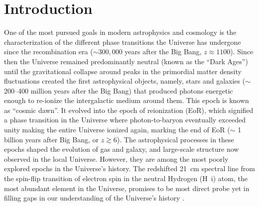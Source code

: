 \documentclass[
reprint,
superscriptaddress,
amsmath,
amssymb,
aps,
]{revtex4-1}
\begin{document}
\pacs{}%


\maketitle


\section{Introduction}\label{sec:intro}

One of the most pursued goals in modern astrophysics and cosmology is the characterization of the different phase transitions the Universe has undergone since the recombination era ($\sim 300,000$ years after the Big Bang, $z\approx 1100$). Since then the Universe remained predominantly neutral (known as the ``Dark Ages'') until the gravitational collapse around peaks in the primordial matter density fluctuations created the first astrophysical objects, namely, stars and galaxies ($\sim$ 200--400 million years after the Big Bang) that produced photons energetic enough to re-ionize the intergalactic medium around them. This epoch is known as ``cosmic dawn''. It evolved into the epoch of reionization (EoR), which signified a phase transition in the Universe where photon-to-baryon eventually exceeded unity making the entire Universe ionized again, marking the end of EoR ($\sim$ 1 billion years after Big Bang, or $z\gtrsim 6$). The astrophysical processes in these epochs shaped the evolution of gas and galaxy, and large-scale structure now observed in the local Universe. However, they are among the most poorly explored epochs in the Universe's history. The redshifted 21~cm spectral line from the spin-flip transition of electron spin in the neutral Hydrogen (H~{\sc i}) atom, the most abundant element in the Universe, promises to be most direct probe yet in filling gaps in our understanding of the Universe's history \cite{sun72,sco90,mad97,toz00,ili02,fan02,fan06,bar07,mor10}.
\end{document}
